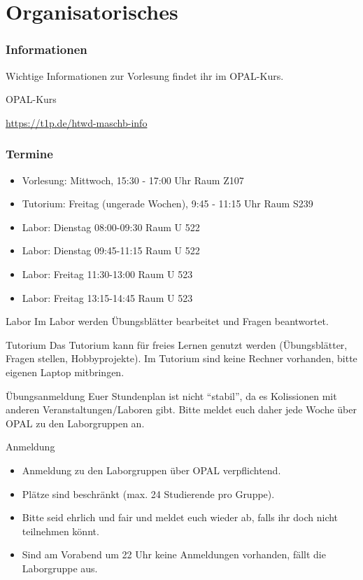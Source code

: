 \documentclass[xelatex,aspectratio=168]{beamer}
\begin{document}
\section{Organisatorisches}

\begin{frame}
  \frametitle{Informationen}
  Wichtige Informationen zur Vorlesung findet ihr im OPAL-Kurs.

  \begin{block}{OPAL-Kurs}
    \begin{center}
      \url{https://t1p.de/htwd-maschb-info}
    \end{center}
  \end{block}
\end{frame}

\begin{frame}
  \frametitle{Termine}
  \begin{itemize}
    \item Vorlesung: Mittwoch, 15:30 - 17:00 Uhr Raum Z107
    \item Tutorium: Freitag (ungerade Wochen), 9:45 - 11:15 Uhr Raum S239
    \item Labor: Dienstag 08:00-09:30 Raum U 522
    \item Labor: Dienstag 09:45-11:15 Raum U 522
    \item Labor: Freitag 11:30-13:00 Raum U 523
    \item Labor: Freitag 13:15-14:45 Raum U 523
  \end{itemize}

  \begin{block}{Labor}
    Im Labor werden Übungsblätter bearbeitet und Fragen beantwortet.
  \end{block}

  \begin{block}{Tutorium}
    Das Tutorium kann für freies Lernen genutzt werden (Übungsblätter, Fragen stellen, Hobbyprojekte). Im Tutorium sind keine Rechner vorhanden, bitte eigenen Laptop mitbringen.
  \end{block}
\end{frame}

\begin{frame}{Übungsanmeldung}
  Euer Stundenplan ist nicht \enquote{stabil}, da es Kolissionen mit anderen Veranstaltungen/Laboren gibt. Bitte meldet euch daher jede Woche über OPAL zu den Laborgruppen an.
  \begin{block}{Anmeldung}
    \begin{itemize}
      \item Anmeldung zu den Laborgruppen über OPAL verpflichtend.
      \item Plätze sind beschränkt (max. 24 Studierende pro Gruppe).
      \item Bitte seid ehrlich und fair und meldet euch wieder ab, falls ihr doch nicht teilnehmen könnt.
      \item Sind am Vorabend um 22 Uhr keine Anmeldungen vorhanden, fällt die Laborgruppe aus.
    \end{itemize}
  \end{block}
\end{frame}
\end{document}
